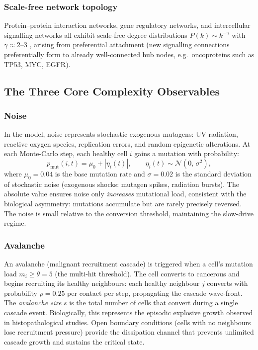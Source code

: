 \documentclass[12pt,a4paper]{article}
\begin{document}
\subsubsection{Scale-free network topology}
Protein--protein interaction networks, gene regulatory networks, and
intercellular signalling networks all exhibit scale-free degree distributions
$P(k) \sim k^{-\gamma}$ with $\gamma \approx 2$--$3$
\citep{barabasi1999emergence}, arising from preferential attachment (new
signalling connections preferentially form to already well-connected hub nodes,
e.g.\ oncoproteins such as TP53, MYC, EGFR).

\subsection{The Three Core Complexity Observables}

\subsubsection{Noise}
In the model, noise represents stochastic exogenous mutagens: UV radiation,
reactive oxygen species, replication errors, and random epigenetic alterations.
At each Monte-Carlo step, each healthy cell $i$ gains a mutation with
probability:
\begin{equation}
  p_{\text{mut}}(i,t) = \mu_0 + |\eta_i(t)|, \qquad
  \eta_i(t) \sim \mathcal{N}(0,\,\sigma^2),
\end{equation}
where $\mu_0 = 0.04$ is the base mutation rate and $\sigma = 0.02$ is the
standard deviation of stochastic noise (exogenous shocks: mutagen spikes,
radiation bursts).  The absolute value ensures noise only \emph{increases}
mutational load, consistent with the biological asymmetry: mutations
accumulate but are rarely precisely reversed.  The noise is small relative to
the conversion threshold, maintaining the slow-drive regime.

\subsubsection{Avalanche}
An avalanche (malignant recruitment cascade) is triggered when a cell's
mutation load $m_i \geq \theta = 5$ (the multi-hit threshold).  The cell
converts to cancerous and begins recruiting its healthy neighbours: each
healthy neighbour $j$ converts with probability $\rho = 0.25$ per contact
per step, propagating the cascade wave-front.  The \emph{avalanche size}
$s$ is the total number of cells that convert during a single cascade event.
Biologically, this represents the episodic explosive growth observed in
histopathological studies.  Open boundary conditions (cells with no
neighbours lose recruitment pressure) provide the dissipation channel that
prevents unlimited cascade growth and sustains the critical state.
\end{document}
